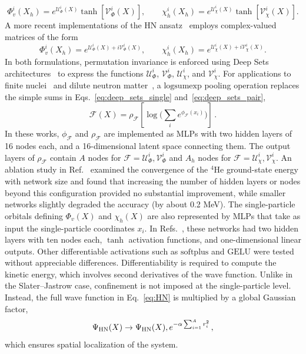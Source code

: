 \begin{equation}
\Phi_v^i(X_h) = e^{\mathcal{U}^i_\Phi(X)}\tanh[\mathcal{V}^i_\Phi(X)], \qquad
\chi_h^i(X_h) = e^{\mathcal{U}^i_\chi(X)}\tanh[\mathcal{V}^i_\chi(X)].
\end{equation}
A more recent implementations of the HN ansatz~\cite{gnech_distilling_2024} employs complex-valued matrices of the form
\begin{equation}
\Phi_v^i(X_h) = e^{\mathcal{U}^i_\Phi(X) + i \mathcal{V}^i_\Phi(X)}, \qquad
\chi_h^i(X_h) = e^{\mathcal{U}^i_\chi(X) + i \mathcal{V}^i_\chi(X)}.
\end{equation}
In both formulations, permutation invariance is enforced using Deep Sets architectures~\cite{zaheer_deep_2017,wagstaff_limitations_2019} to express the functions $\mathcal{U}^i_\Phi$, $\mathcal{V}^i_\Phi$, $\mathcal{U}^i_\chi$, and $\mathcal{V}^i_\chi$. For applications to finite nuclei~\cite{lovato_hidden-nucleons_2022} and dilute neutron matter~\cite{fore2023}, a $\mathrm{logsumexp}$ pooling operation replaces the simple sums in Eqs.~\eqref{eq:deep_sets_single} and~\eqref{eq:deep_sets_pair},
\begin{equation}
\mathcal{F}(X)= \rho_\mathcal{F}\left[\log\Big(\sum_i e^{\phi_\mathcal{F}(x_i)}\Big)\right]\,.
\end{equation}
In these works, $\phi_\mathcal{F}$ and $\rho_\mathcal{F}$ are implemented as MLPs with two hidden layers of 16 nodes each, and a 16-dimensional latent space connecting them. The output layers of $\rho_\mathcal{F}$ contain $A$ nodes for $\mathcal{F}=\mathcal{U}^i_\Phi,\mathcal{V}^i_\Phi$ and $A_h$ nodes for $\mathcal{F}=\mathcal{U}^i_\chi,\mathcal{V}^i_\chi$. An ablation study in Ref.~\cite{lovato_hidden-nucleons_2022} examined the convergence of the $^4$He ground-state energy with network size and found that increasing the number of hidden layers or nodes beyond this configuration provided no substantial improvement, while smaller networks slightly degraded the accuracy (by about 0.2 MeV).
The single-particle orbitals defining $\Phi_v(X)$ and $\chi_h(X)$ are also represented by MLPs that take as input the single-particle coordinates $x_i$. In Refs.~\cite{lovato_hidden-nucleons_2022,fore2023}, these networks had two hidden layers with ten nodes each, $\tanh$ activation functions, and one-dimensional linear outputs. Other differentiable activations such as $\mathrm{softplus}$ and $\mathrm{GELU}$ were tested without appreciable differences. Differentiability is required to compute the kinetic energy, which involves second derivatives of the wave function.
Unlike in the Slater–Jastrow case, confinement is not imposed at the single-particle level. Instead, the full wave function in Eq.~\eqref{eq:HN} is multiplied by a global Gaussian factor,
\begin{equation}
\Psi_{\rm HN} (X) \to \Psi_{\rm HN} (X), e^{-\alpha \sum_{i=1}^A r_i^2}\,,
\end{equation}
which ensures spatial localization of the system.

